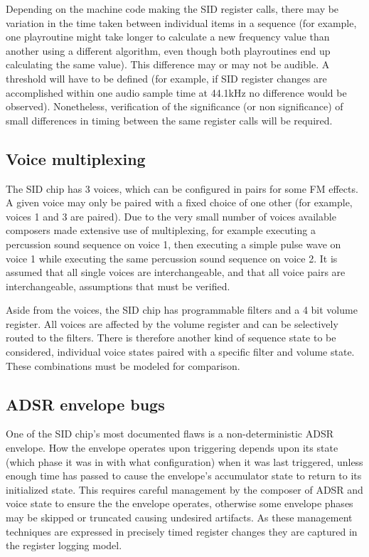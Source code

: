\documentclass[10pt]{article}
\begin{document}
\begin{multicols*}{2}
  Depending on the machine code making the SID register calls, there
  may be variation in the time taken between individual items in a
  sequence (for example, one playroutine might take longer to calculate a
  new frequency value than another using a different algorithm, even
  though both playroutines end up calculating the same value). This
  difference may or may not be audible. A threshold will have to be
  defined (for example, if SID register changes are accomplished
  within one audio sample time at 44.1kHz no difference would be
  observed).  Nonetheless, verification of the significance (or non
  significance) of small differences in timing between the same
  register calls will be required.

  \subsection{Voice multiplexing}
  The SID chip has 3 voices, which can be configured in pairs for some
  FM effects. A given voice may only be paired with a fixed choice of
  one other (for example, voices 1 and 3 are paired). Due to the very
  small number of voices available composers made extensive use of
  multiplexing, for example executing a percussion sound sequence on
  voice 1, then executing a simple pulse wave on voice 1 while
  executing the same percussion sound sequence on voice 2. It is
  assumed that all single voices are interchangeable, and that all
  voice pairs are interchangeable, assumptions that must be verified.

  Aside from the voices, the SID chip has programmable filters and a 4
  bit volume register. All voices are affected by the volume register
  and can be selectively routed to the filters. There is therefore
  another kind of sequence state to be considered, individual voice
  states paired with a specific filter and volume state. These
  combinations must be modeled for comparison.

  \subsection{ADSR envelope bugs}
  One of the SID chip's most documented flaws is a non-deterministic
  ADSR envelope. How the envelope operates upon triggering depends
  upon its state (which phase it was in with what configuration) when
  it was last triggered, unless enough time has passed to cause the
  envelope's accumulator state to return to its initialized state.
  This requires careful management by the composer of ADSR and voice
  state to ensure the the envelope operates, otherwise some envelope
  phases may be skipped or truncated causing undesired artifacts. As
  these management techniques are expressed in precisely timed
  register changes they are captured in the register logging model.


\end{multicols*}
\end{document}
